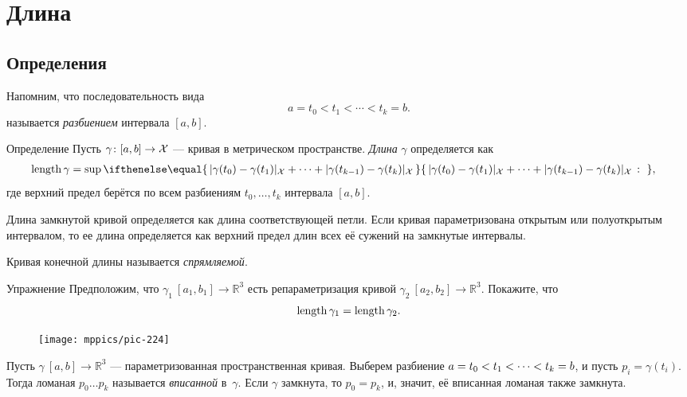 \chapter{Длина}
\label{chap:length}

\section{Определения}

Напомним, что последовательность вида 
\[a=t_0 < t_1 < \cdots < t_k=b.\]
называется \emph{разбиением} интервала $[a,b]$.

\begin{thm}{Определение}\label{def:length}
Пусть $\gamma\colon[a,b]\to \mathcal{X}$ --- кривая в метрическом пространстве.
\emph{Длина} $\gamma$ определяется как
\begin{align*}
\length \gamma
&= 
\sup
\set{\dist{\gamma(t_0)}{\gamma(t_1)}{\spc{X}}
+\dots+
\dist{\gamma(t_{k-1})}{\gamma(t_k)}{\spc{X}}}{},
\end{align*}
где верхний предел берётся по всем разбиениям $t_0,\dots,t_k$ интервала $[a,b]$.

Длина замкнутой кривой определяется как длина соответствующей петли.
Если кривая параметризована открытым или полуоткрытым интервалом, то ее длина определяется как верхний предел длин всех её сужений на замкнутые интервалы.
\end{thm}

Кривая конечной длины называется \emph{спрямляемой}.

\begin{thm}{Упражнение}\label{ex:integral-length-0}
Предположим, что $\gamma_1\:[a_1,b_1] \to\mathbb{R}^3$ есть репараметризация кривой $\gamma_2\:[a_2,b_2] \to\mathbb{R}^3$. 
Покажите, что
\[\mathop{\rm length}\nolimits \gamma_1 = \mathop{\rm length}\nolimits \gamma_2.\]
\end{thm}

\begin{wrapfigure}[4]{r}{33 mm}
\vskip-4mm
\centering
\texttt{[image: mppics/pic-224]}
\end{wrapfigure}

Пусть $\gamma\:[a,b]\to \mathbb{R}^3$ --- параметризованная пространственная кривая.
Выберем разбиение $a\z=t_0 < t_1 < \cdots < t_k=b$, и пусть $p_i=\gamma(t_i)$.
Тогда ломаная $p_0\dots p_k$ называется \emph{вписанной} в~$\gamma$.
Если $\gamma$ замкнута, то $p_0=p_k$, и, значит, её вписанная ломаная также замкнута.

